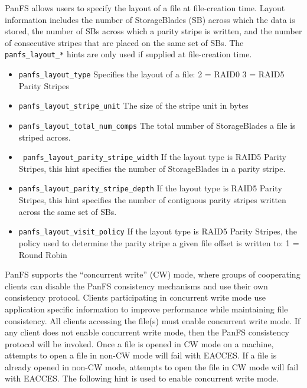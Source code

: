 PanFS allows users to specify the layout of a file at file-creation time.
Layout information includes the number of StorageBlades (SB) across which the
data is stored, the number of SBs across which a parity stripe is written, and
the number of consecutive stripes that are placed on the same set of SBs.   The
\texttt{panfs\_layout\_*} hints are only used if supplied at file-creation
time.
\begin{itemize}

\item \texttt{panfs\_layout\_type} Specifies the layout of a file: 2 = RAID0
3 = RAID5 Parity Stripes 

\item \texttt{panfs\_layout\_stripe\_unit} The size of the stripe unit
in bytes

\item \texttt{panfs\_layout\_total\_num\_comps} The total number of
StorageBlades a file is striped across.

\item \texttt{ panfs\_layout\_parity\_stripe\_width}  If the layout type is
RAID5 Parity Stripes, this hint specifies the number of StorageBlades in a
parity stripe.

\item \texttt{panfs\_layout\_parity\_stripe\_depth} If the layout type is RAID5
Parity Stripes, this hint specifies the number of contiguous parity stripes
written across the same set of SBs.

\item \texttt{panfs\_layout\_visit\_policy} If the layout type is RAID5 Parity
Stripes, the policy used to determine the parity stripe a given file offset is
written to: 1 = Round Robin 
\end{itemize}

PanFS supports the ``concurrent write'' (CW) mode, where groups of
cooperating clients can disable the PanFS consistency mechanisms and use
their own consistency protocol.  Clients participating in concurrent
write mode use application specific information to improve performance
while maintaining file consistency.  All clients accessing the file(s)
must enable concurrent write mode.  If any client does not enable
concurrent write mode, then the PanFS consistency protocol will be
invoked.  Once a file is opened in CW mode on a machine, attempts to
open a file in non-CW mode will fail with EACCES.  If a file is already
opened in non-CW mode, attempts to open the file in CW mode will fail
with EACCES.  The following hint is used to enable concurrent write
mode.

